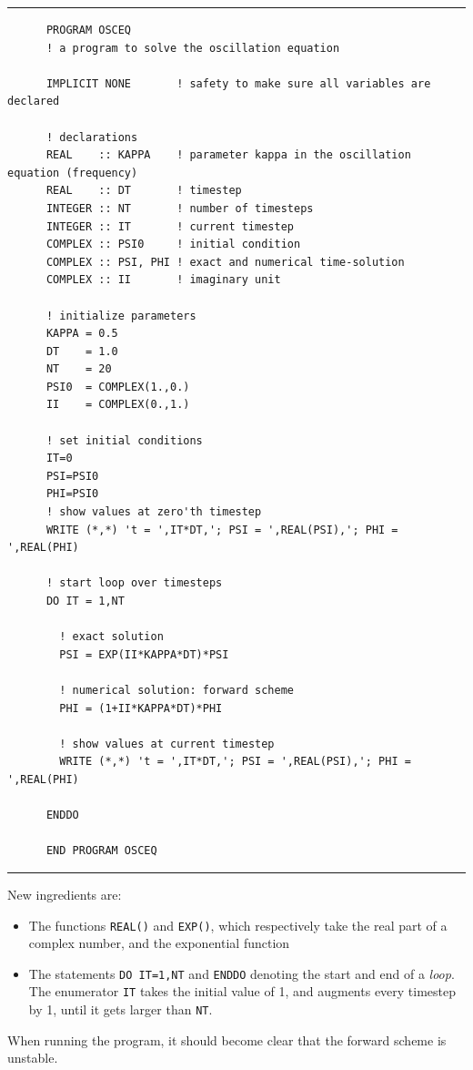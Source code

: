 \documentclass[a4paper]{article}
\begin{document}
{\vspace{10pt}\hrule\small\vspace*{-2pt}\begin{verbatim}
	  PROGRAM OSCEQ
	  ! a program to solve the oscillation equation

	  IMPLICIT NONE       ! safety to make sure all variables are declared

	  ! declarations
	  REAL    :: KAPPA    ! parameter kappa in the oscillation equation (frequency)
	  REAL    :: DT       ! timestep
	  INTEGER :: NT       ! number of timesteps
	  INTEGER :: IT       ! current timestep
	  COMPLEX :: PSI0     ! initial condition
	  COMPLEX :: PSI, PHI ! exact and numerical time-solution
	  COMPLEX :: II       ! imaginary unit

	  ! initialize parameters
	  KAPPA = 0.5
	  DT    = 1.0
	  NT    = 20
	  PSI0  = COMPLEX(1.,0.)
	  II    = COMPLEX(0.,1.)

	  ! set initial conditions
	  IT=0
	  PSI=PSI0
	  PHI=PSI0
	  ! show values at zero'th timestep
	  WRITE (*,*) 't = ',IT*DT,'; PSI = ',REAL(PSI),'; PHI = ',REAL(PHI)

	  ! start loop over timesteps
	  DO IT = 1,NT

	    ! exact solution
	    PSI = EXP(II*KAPPA*DT)*PSI

	    ! numerical solution: forward scheme
	    PHI = (1+II*KAPPA*DT)*PHI

	    ! show values at current timestep
	    WRITE (*,*) 't = ',IT*DT,'; PSI = ',REAL(PSI),'; PHI = ',REAL(PHI)

	  ENDDO

	  END PROGRAM OSCEQ
\end{verbatim}\hrule\vspace{5pt}}
%
\par
New ingredients are:
%
\begin{itemize}
	\item The functions \verb+REAL()+ and \verb+EXP()+, which respectively take the real part of a complex number, and the exponential function
	\item The statements \verb+DO IT=1,NT+ and \verb+ENDDO+ denoting the start and end of a \emph{loop}. The enumerator \verb+IT+ takes the initial value of 1, and augments every timestep by 1, until it gets larger than \verb+NT+.
\end{itemize}
%
\par
When running the program, it should become clear that the forward scheme is unstable.
%
\end{document}
